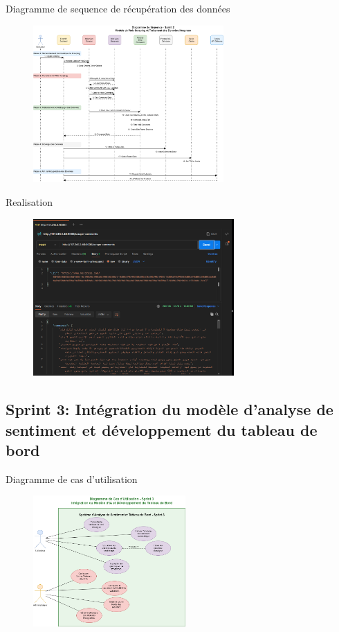 \begin{frame}{Diagramme de sequence de récupération des données}
    \begin{figure}[H]
        \centering
        \includegraphics[height=6cm]{assets/images/sprint2-sequence.png}
    \end{figure}
\end{frame}

\begin{frame}{Realisation}
    \begin{figure}[H]
        \centering
        \includegraphics[height=6cm]{assets/images/scrape-ui.png}
    \end{figure}
\end{frame}



\subsection{Sprint 3: Intégration du modèle d'analyse de sentiment et développement du tableau de bord}
\begin{frame}{Diagramme de cas d'utilisation}

    \begin{figure}[H]
        \centering
        \includegraphics[height=5cm]{assets/images/sprint3-usecase.png}
    \end{figure}
\end{frame}

